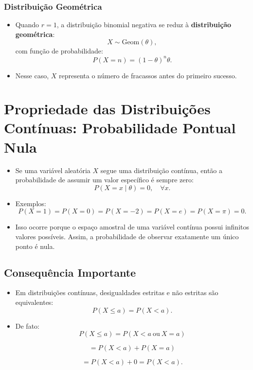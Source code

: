 \documentclass[
  letterpaper,
  DIV=11,
  numbers=noendperiod]{scrreprt}
\begin{document}
\subsubsection*{Distribuição
Geométrica}\label{distribuiuxe7uxe3o-geomuxe9trica}

\begin{itemize}
\item
  Quando \(r = 1\), a distribuição binomial negativa se reduz à
  \textbf{distribuição geométrica}: \[X \sim \text{Geom}(\theta),\] com
  função de probabilidade: \[P(X = n) = (1 - \theta)^n \theta.\]
\item
  Nesse caso, \(X\) representa o número de fracassos antes do primeiro
  sucesso.
\end{itemize}

\section{Propriedade das Distribuições Contínuas: Probabilidade Pontual
Nula}\label{propriedade-das-distribuiuxe7uxf5es-contuxednuas-probabilidade-pontual-nula}

\begin{itemize}
\item
  Se uma variável aleatória \(X\) segue uma distribuição contínua, então
  a probabilidade de assumir um valor específico é sempre zero:
  \[P(X = x \mid \theta) = 0, \quad \forall x.\]
\item
  Exemplos:
  \[P(X = 1) = P(X = 0) = P(X = -2) = P(X = e) = P(X = \pi) = 0.\]
\item
  Isso ocorre porque o espaço amostral de uma variável contínua possui
  infinitos valores possíveis. Assim, a probabilidade de observar
  exatamente um único ponto é nula.
\end{itemize}

\subsection*{Consequência Importante}\label{consequuxeancia-importante}

\begin{itemize}
\item
  Em distribuições contínuas, desigualdades estritas e não estritas são
  equivalentes: \[P(X \leq a) = P(X < a).\]
\item
  De fato: \[P(X \leq a) = P(X < a \ \text{ou} \ X = a)\]

  \[= P(X < a) + P(X = a) \tag{pela aditividade da probabilidade}\]

  \[= P(X < a) + 0 = P(X < a).\]
\end{itemize}
\end{document}
